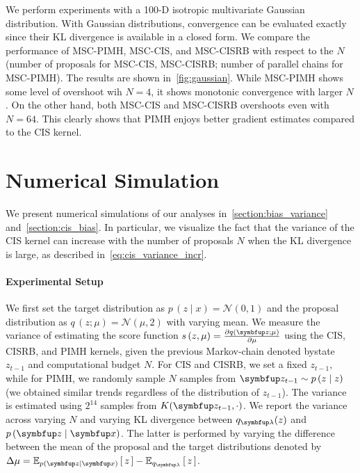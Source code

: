 %
We perform experiments with a 100-D isotropic multivariate Gaussian distribution.
With Gaussian distributions, convergence can be evaluated exactly since their KL divergence is available in a closed form.
We compare the performance of MSC-PIMH, MSC-CIS, and MSC-CISRB with respect to the \(N\) (number of proposals for MSC-CIS, MSC-CISRB; number of parallel chains for MSC-PIMH).
The results are shown in~\cref{fig:gaussian}.
While MSC-PIMH shows some level of overshoot wih \(N=4\), it shows monotonic convergence with larger \(N\).
On the other hand, both MSC-CIS and MSC-CISRB overshoots even with \(N=64\).
This clearly shows that PIMH enjoys better gradient estimates compared to the CIS kernel.

\section{Numerical Simulation}
We present numerical simulations of our analyses in~\cref{section:bias_variance} and~\cref{section:cis_bias}.
In particular, we visualize the fact that the variance of the CIS kernel can increase with the number of proposals \(N\) when the KL divergence is large, as described in~\eqref{eq:cis_variance_incr}.

\paragraph{Experimental Setup}
We first set the target distribution as \(p\,(z \mid x) = \mathcal{N}(0, 1)\) and the proposal distribution as \(q\,(z; \mu) = \mathcal{N}(\mu, 2)\) with varying mean.
We measure the variance of estimating the score function \(s\,(z, \mu) = \frac{\partial q(\vz; \mu)}{\partial \mu} \) using the CIS, CISRB, and PIMH kernels, given the previous Markov-chain  denoted bystate \(z_{t-1}\) and computational budget \(N\).
For CIS and CISRB, we set a fixed \(z_{t-1}\), while for PIMH, we randomly sample \(N\) samples from \(\vz_{t-1} \sim p\,(z \mid z)\) (we obtained similar trends regardless of the distribution of \(z_{t-1}\)).
The variance is estimated using \(2^{14}\) samples from \(K(\vz_{t-1}, \cdot)\).
We report the variance across varying \(N\) and varying KL divergence between \(q_{\vlambda}(z)\) and \(p\,(\vz\mid\vx)\).
The latter is performed by varying the difference between the mean of the proposal and the target distributions denoted by \(\Delta \mu = \Esub{p(\vz\mid\vx)}{z} - \Esub{q_{\vlambda}}{z} \).

